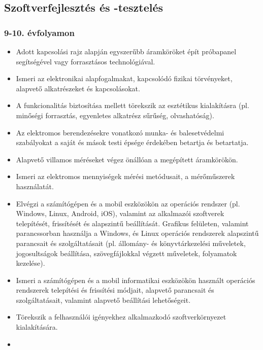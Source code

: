 \hypertarget{szoftverfejlesztes-es--teszteles}{%
\subsection{Szoftverfejlesztés és
-tesztelés}\label{szoftverfejlesztes-es--teszteles}}

\hypertarget{evfolyamon-8}{%
\subsubsection{9-10. évfolyamon}\label{evfolyamon-8}}

\begin{itemize}
\tightlist
\item
  Adott kapcsolási rajz alapján egyszerűbb áramköröket épít próbapanel
  segítségével vagy forrasztásos technológiával.
\item
  Ismeri az elektronikai alapfogalmakat, kapcsolódó fizikai törvényeket,
  alapvető alkatrészeket és kapcsolásokat.
\item
  A funkcionalitás biztosítása mellett törekszik az esztétikus
  kialakításra (pl. minőségi forrasztás, egyenletes alkatrész sűrűség,
  olvashatóság).
\item
  Az elektromos berendezésekre vonatkozó munka- és balesetvédelmi
  szabályokat a saját és mások testi épsége érdekében betartja és
  betartatja.
\item
  Alapvető villamos méréseket végez önállóan a megépített áramkörökön.
\item
  Ismeri az elektromos mennyiségek mérési metódusait, a mérőműszerek
  használatát.
\item
  Elvégzi a számítógépen és a mobil eszközökön az operációs rendszer
  (pl. Windows, Linux, Android, iOS), valamint az alkalmazói szoftverek
  telepítését, frissítését és alapszintű beállítását. Grafikus
  felületen, valamint parancssorban használja a Windows, és Linux
  operációs rendszerek alapszintű parancsait és szolgáltatásait (pl.
  állomány- és könyvtárkezelési műveletek, jogosultságok beállítása,
  szövegfájlokkal végzett műveletek, folyamatok kezelése).
\item
  Ismeri a számítógépen és a mobil informatikai eszközökön használt
  operációs rendszerek telepítési és frissítési módjait, alapvető
  parancsait és szolgáltatásait, valamint alapvető beállítási
  lehetőségeit.
\item
  Törekszik a felhasználói igényekhez alkalmazkodó szoftverkörnyezet
  kialakítására.
\item

\end{itemize}
